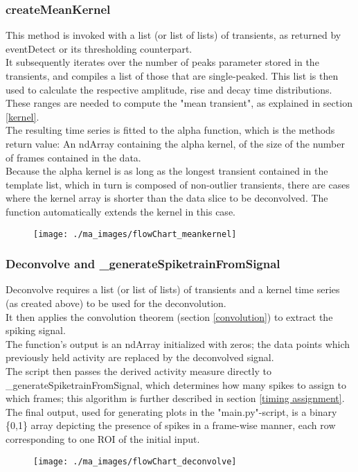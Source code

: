 \documentclass[titlepage]{article}
\begin{document}
\subsubsection{createMeanKernel}
This method is invoked with a list (or list of lists) of transients, as returned by eventDetect or its thresholding counterpart.\\
It subsequently iterates over the number of peaks parameter stored in the transients, and compiles a list of those that are single-peaked. This list is then used to calculate the respective amplitude, rise and decay time distributions.\\
These ranges are needed to compute the "mean transient", as explained in section \ref{kernel}.\\
The resulting time series is fitted to the alpha function, which is the methods return value:
An ndArray containing the alpha kernel, of the size of the number of frames contained in the data.\\
Because the alpha kernel is as long as the longest transient contained in the template list, which in turn is composed of non-outlier transients, there are cases where the kernel array is shorter than the data slice to be deconvolved. The function automatically extends the kernel in this case.
\begin{figure}[H]
\centering
\texttt{[image: ./ma\_images/flowChart\_meankernel]}
\label{fig:flowChart_meankernel}
\end{figure}

\subsubsection{Deconvolve and \_generateSpiketrainFromSignal}
Deconvolve requires a list (or list of lists) of transients and a kernel time series (as created above) to be used for the deconvolution.\\
It then applies the convolution theorem (section \ref{convolution}) to extract the spiking signal.\\
The function's output is an ndArray initialized with zeros; the data points which previously held activity are replaced by the deconvolved signal.\\
The script then passes the derived activity measure directly to \_generateSpiketrainFromSignal, which determines how many spikes to assign to which frames; this algorithm is further described in section \ref{timing assignment}.\\
The final output, used for generating plots in the "main.py"-script, is a binary \{0,1\} array depicting the presence of spikes in a frame-wise manner, each row corresponding to one ROI of the initial input.
\begin{figure}[H] 
\centering
\texttt{[image: ./ma\_images/flowChart\_deconvolve]}
\label{fig:flowChart_deconvolve}
\end{figure}
\end{document}
